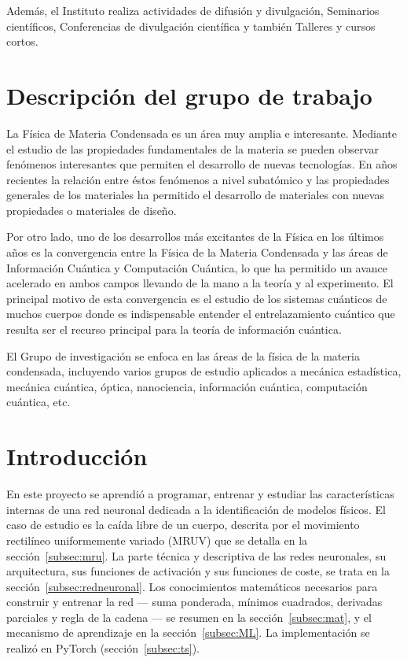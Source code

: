 \documentclass[titlepage,11pt]{article}
\begin{document}
Además, el Instituto realiza actividades de difusión y divulgación, Seminarios
científicos, Conferencias de divulgación científica y también Talleres y
cursos cortos.


\section{Descripción del grupo de trabajo}
\label{sec:grupo}
La Física de Materia Condensada es un área muy amplia e interesante. Mediante
el estudio de las propiedades fundamentales de la materia se pueden observar
fenómenos interesantes que permiten el desarrollo de nuevas tecnologías. En
años recientes la relación entre éstos fenómenos a nivel subatómico y las
propiedades generales de los materiales ha permitido el desarrollo de
materiales con nuevas propiedades o materiales de diseño.

Por otro lado, uno de los desarrollos más excitantes de la Física en los
últimos años es la convergencia entre la Física de la Materia Condensada y las
áreas de Información Cuántica y Computación Cuántica, lo que ha permitido un
avance acelerado en ambos campos llevando de la mano a la teoría y al
experimento. El principal motivo de esta convergencia es el estudio de los
sistemas cuánticos de muchos cuerpos donde es indispensable entender el
entrelazamiento cuántico que resulta ser el recurso principal para la teoría
de información cuántica.

El Grupo de investigación se enfoca en las áreas de la física de la materia
condensada, incluyendo varios grupos de estudio aplicados a mecánica
estadística, mecánica cuántica, óptica, nanociencia, información cuántica,
computación cuántica, etc.


\section{Introducción}
\label{sec:introduccion}
En este proyecto se aprendió a programar, entrenar y estudiar las
características internas de una red neuronal dedicada a la identificación de
modelos físicos. El caso de estudio es la caída libre de un cuerpo, descrita
por el movimiento rectilíneo uniformemente variado (MRUV) que se detalla en la
sección~\ref{subsec:mru}. La parte técnica y descriptiva de las redes
neuronales, su arquitectura, sus funciones de activación y sus funciones de
coste, se trata en la sección~\ref{subsec:redneuronal}. Los conocimientos
matemáticos necesarios para construir y entrenar la red --- suma ponderada,
mínimos cuadrados, derivadas parciales y regla de la cadena --- se resumen en
la sección~\ref{subsec:mat}, y el mecanismo de aprendizaje en la
sección~\ref{subsec:ML}. La implementación se realizó en
PyTorch (sección~\ref{subsec:ts}).
\end{document}
